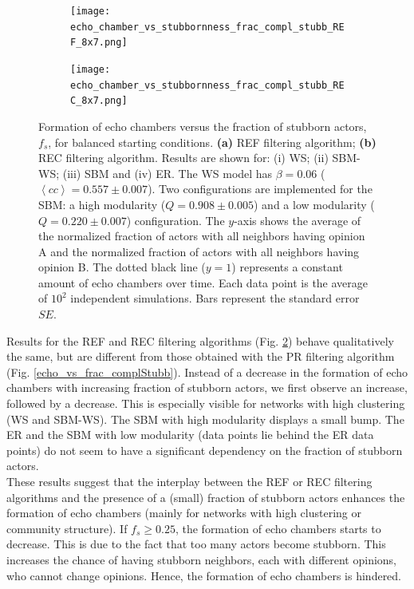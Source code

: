 \documentclass[11 pt , letterpaper , twoside , openright]{book}
\begin{document}
\begin{figure}[H]
  \begin{subfigure}[t]{0.49\textwidth}
    \caption{}
  	\texttt{[image: echo\_chamber\_vs\_stubbornness\_frac\_compl\_stubb\_REF\_8x7.png]}
  \end{subfigure}
  \begin{subfigure}[t]{0.49\textwidth}
    \caption{}
  	\texttt{[image: echo\_chamber\_vs\_stubbornness\_frac\_compl\_stubb\_REC\_8x7.png]}
    \label{REC_frac_compl_stubb}
  \end{subfigure}
  \captionsetup{format=plain}
  \caption[Formation of echo chambers versus fraction of stubborn actors for the REF and REC filtering algorithms and balanced starting conditions.]{Formation of echo chambers versus the fraction of stubborn actors, $f_s$, for balanced starting conditions. \textbf{(a)} REF filtering algorithm; \textbf{(b)} REC filtering algorithm. Results are shown for: (i) WS; (ii) SBM-WS; (iii) SBM and (iv) ER. The WS model has $\beta = 0.06$ ($\left<cc\right> = 0.557 \pm 0.007$). Two configurations are implemented for the SBM: a high modularity ($Q = 0.908 \pm 0.005$) and a low modularity ($Q = 0.220 \pm 0.007$) configuration. The $y$-axis shows the average of the normalized fraction of actors with all neighbors having opinion A and the normalized fraction of actors with all neighbors having opinion B. The dotted black line ($y=1$) represents a constant amount of echo chambers over time. Each data point is the average of $10^2$ independent simulations. Bars represent the standard error $SE$.}
\label{echo_vs_frac_complStubb_REF-REC}
\end{figure}
\noindent
Results for the REF and REC filtering algorithms (Fig. \ref{echo_vs_frac_complStubb_REF-REC}) behave qualitatively the same, but are different from those obtained with the PR filtering algorithm (Fig. \ref{echo_vs_frac_complStubb}). Instead of a decrease in the formation of echo chambers with increasing fraction of stubborn actors, we first observe an increase, followed by a decrease. This is especially visible for networks with high clustering (WS and SBM-WS). The SBM with high modularity displays a small bump. The ER and the SBM with low modularity (data points lie behind the ER data points) do not seem to have a significant dependency on the fraction of stubborn actors.\\
\newline
These results suggest that the interplay between the REF or REC filtering algorithms and the presence of a (small) fraction of stubborn actors enhances the formation of echo chambers (mainly for networks with high clustering or community structure). If $f_s \geqslant 0.25$, the formation of echo chambers starts to decrease. This is due to the fact that too many actors become stubborn. This increases the chance of having stubborn neighbors, each with different opinions, who cannot change opinions. Hence, the formation of echo chambers is hindered.\\
\end{document}
